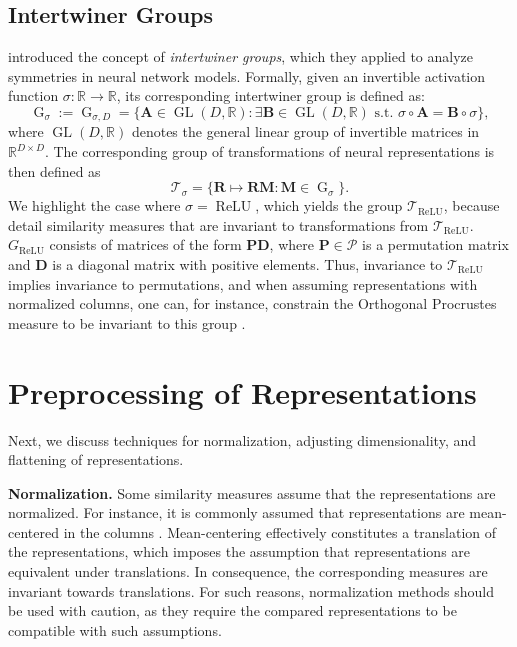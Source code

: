 \documentclass{article}
\newcommand{\citet}{\textcite}
\newcommand{\Real}{\mathbb{R}}
\newcommand{\R}{\bm{R}}
\newcommand{\subheader}{\textbf}
\begin{document}
\begin{refsegment}
\subsection{Intertwiner Groups}\label{ap:intertwiner}
\citet{godfrey_symmetries_2022} introduced the concept of \emph{intertwiner groups}, which they applied to analyze symmetries in neural network models.
Formally, given an invertible activation function $\sigma: \Real \longrightarrow \Real$, its corresponding intertwiner group is defined as:
\begin{equation}\label{eq:intertwiner_group}
    \operatorname{G}_{\sigma} := \operatorname{G}_{\sigma, D}= \{ \bm{A} \in \operatorname{GL}(D, \Real) : \exists \bm{B} \in \operatorname{GL}(D, \Real) \text{ s.t. } \sigma \circ \bm{A} = \bm{B} \circ \sigma\},
\end{equation}
where $\operatorname{GL}(D, \Real)$ denotes the general linear group of invertible matrices in $\Real^{D\times D}$.
The corresponding group of transformations of neural representations is then defined as
\begin{equation}\label{eq:intertwiner_transformers}
    \mathcal{T}_\sigma = \{\R\mapsto \R \bm{M} : \bm{M}\in\operatorname{G}_{\sigma}\}.
\end{equation}
We highlight the case where $\sigma = \operatorname{ReLU}$, which yields the group $\mathcal{T}_{\operatorname{ReLU}}$, because \citet{godfrey_symmetries_2022} detail similarity measures that are invariant to transformations from
 $\mathcal{T}_{\operatorname{ReLU}}$.
$G_{\operatorname{ReLU}}$ consists of matrices of the form $\bm{PD}$, where $\bm{P} \in \mathcal{P}$ is a permutation matrix and $\bm{D}$ is a diagonal matrix with positive elements.
Thus, invariance to $\mathcal{T}_{\operatorname{ReLU}}$ implies invariance to permutations, and when assuming representations with normalized columns, one can, for instance, constrain the Orthogonal Procrustes measure to be invariant to this group \cite{godfrey_symmetries_2022}.


\section{Preprocessing of Representations}\label{ap:preprocessing}

Next, we discuss techniques for normalization, adjusting dimensionality, and flattening of representations.

\subheader{Normalization.}
Some similarity measures assume that the representations are normalized.
For instance, it is commonly assumed that representations are mean-centered in the columns \cite{kornblith_similarity_2019,williams_generalized_2022,morcos_insights_2018}.
Mean-centering effectively constitutes a translation of the representations, which imposes the assumption that representations are equivalent under translations.
In consequence, the corresponding measures are invariant towards translations.
For such reasons, normalization methods should be used with caution, as they require the compared representations to be compatible with such assumptions.


\end{refsegment}
\end{document}
